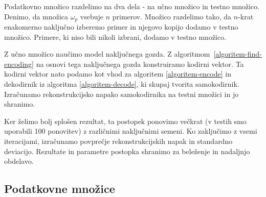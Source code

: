 \documentclass[12pt,a4paper,twoside]{article}
\theoremstyle{definition} %
\theoremstyle{plain} %
\numberwithin{equation}{section}  %
\begin{document}


Podatkovno množico razdelimo na dva dela - na učno množico in testno množico.
Denimo, da množica $\omega_p$ vsebuje $n$ primerov.
Množico razdelimo tako, da $n$-krat enakomerno naključno izberemo primer in njegovo kopijo dodamo v testno množico.
Primere, ki niso bili nikoli izbrani, dodamo v testno množico.

Z učno množico naučimo model naključnega gozda. %
Z algoritmom~\ref{algoritem-find-encoding} na osnovi tega naključnega gozda konstruiramo kodirni vektor.
Ta kodirni vektor nato podamo kot vhod za algoritem \ref{algoritem-encode} in dekodirnik iz algoritma \ref{algoritem-decode}, ki skupaj tvorita samokodirnik.
Izračunamo rekonstrukcijsko napako samokodirnika na testni množici in jo shranimo.

Ker želimo bolj splošen rezultat, ta postopek ponovimo večkrat (v testih smo uporabili 100 ponovitev) z različnimi naključnimi semeni.
Ko zaključimo z vsemi iteracijami, izračunamo povprečje rekonstrukcijskih napak in standardno deviacijo. %
Rezultate in parametre postopka shranimo za beleženje in nadaljnjo obdelavo.



\subsection{Podatkovne množice}
\label{pogl:podatkovne_mnozice}
\end{document}
